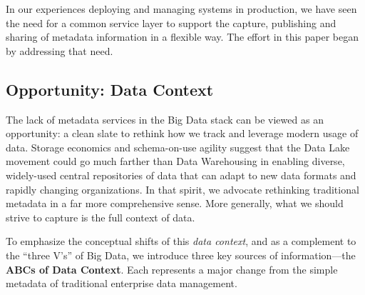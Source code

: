 \documentclass{sig-alternate}
\begin{document}

In our experiences deploying and managing systems in production, we 
have seen the need for a common service layer to support the capture, publishing and sharing of metadata information in a flexible way. 
The effort in this paper began by addressing that need.

\subsection{Opportunity: Data Context}
The lack of metadata services in the Big Data stack can be viewed as an opportunity:
a clean slate to rethink how we track and leverage modern usage of data.
Storage economics and schema-on-use agility suggest that the Data Lake movement could go much farther than Data Warehousing in enabling diverse, widely-used central repositories of data that can adapt to new data formats and rapidly changing organizations.
In that spirit, we advocate rethinking traditional metadata in a far more comprehensive sense. 
More generally, what we should strive to capture is the full context of data.

To emphasize the conceptual shifts of this \emph{data context}, and as a complement to the ``three V's'' of Big Data,
we introduce three key sources of information---the \textbf{ABCs of Data Context}. Each represents a major change from the simple metadata of traditional enterprise data management.


\end{document}
